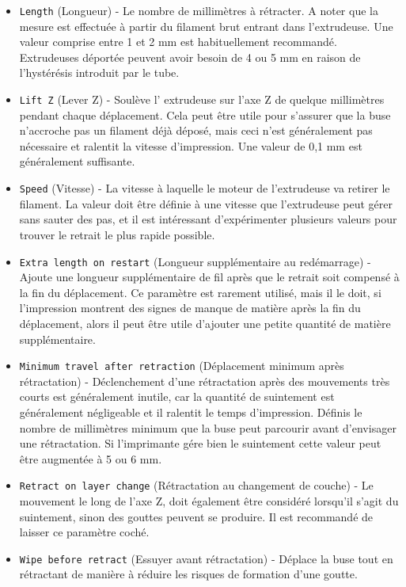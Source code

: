 \begin{itemize}
    \item \texttt{Length} (Longueur) - Le nombre de millim\`etres \`a r\'etracter. A noter que la mesure est effectu\'ee \`a partir du filament brut entrant dans l'extrudeuse. Une valeur comprise entre 1 et 2 mm est habituellement recommand\'e. Extrudeuses d\'eport\'ee peuvent avoir besoin de 4 ou 5 mm en raison de l'hyst\'er\'esis introduit par le tube.
    \item \texttt{Lift Z} (Lever Z) - Soul\`eve l' extrudeuse sur l'axe Z de quelque millim\`etres pendant chaque d\'eplacement. Cela peut \^etre utile pour s'assurer que la buse n'accroche pas un filament d\'ej\`a d\'epos\'e, mais ceci n'est g\'en\'eralement pas n\'ecessaire et ralentit la vitesse d'impression. Une valeur de 0,1 mm est g\'en\'eralement suffisante.
    \item \texttt{Speed} (Vitesse) - La vitesse \`a laquelle le moteur de l'extrudeuse va retirer le filament. La valeur doit \^etre d\'efinie \`a une vitesse que l'extrudeuse peut g\'erer sans sauter des pas, et il est int\'eressant d'exp\'erimenter plusieurs valeurs pour trouver le retrait le plus rapide possible.
    \item \texttt{Extra length on restart} (Longueur suppl\'ementaire au red\'emarrage) -  Ajoute une longueur suppl\'ementaire de fil apr\`es que le retrait soit compens\'e \`a la fin du d\'eplacement. Ce param\`etre est rarement utilis\'e, mais il le doit, si l'impression montrent des signes de manque de mati\`ere apr\`es la fin du d\'eplacement, alors il peut \^etre utile d'ajouter une petite quantit\'e de mati\`ere suppl\'ementaire.
    \item \texttt{Minimum travel after retraction} (D\'eplacement minimum apr\`es r\'etractation) - D\'eclenchement d'une r\'etractation apr\`es des mouvements tr\`es courts est g\'en\'eralement inutile, car la quantit\'e de suintement est g\'en\'eralement n\'egligeable et il ralentit le temps d'impression.  D\'efinis le nombre de millim\`etres minimum que la buse peut parcourir avant d'envisager une r\'etractation.  Si l'imprimante g\'ere bien le suintement cette valeur peut \^etre augment\'ee \`a 5 ou 6 mm.
    \item \texttt{Retract on layer change} (R\'etractation au changement de couche) - Le mouvement le long de l'axe Z, doit \'egalement \^etre consid\'er\'e lorsqu'il s'agit du suintement, sinon des gouttes peuvent se produire. Il est recommand\'e de laisser ce param\`etre coch\'e.
    \item \texttt{Wipe before retract} (Essuyer avant r\'etractation) - D\'eplace la buse tout en r\'etractant de mani\`ere \`a r\'eduire les risques de formation d'une goutte.
\end{itemize}


